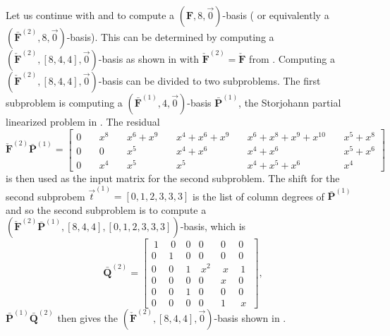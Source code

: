 \begin{exmp}
\label{exm:subproblems} Let us continue with 
and  to compute a $\left(\mathbf{F},8,\vec{0}\right)$-basis
( or equivalently a $(\bar{\mathbf{F}}^{\left(2\right)},8,\vec{0})$-basis).
This can be determined by computing a $(\check{\mathbf{F}}^{\left(2\right)},[8,4,4],\vec{0})$-basis
as shown in  with $\check{\mathbf{F}}^{\left(2\right)}=\check{\mathbf{F}}$
from . Computing a $(\check{\mathbf{F}}^{\left(2\right)},[8,4,4],\vec{0})$-basis
can be divided to two subproblems. The first subproblem is computing
a $(\bar{\mathbf{F}}^{\left(1\right)},4,\vec{0})$-basis $\bar{\mathbf{P}}^{\left(1\right)}$,
the Storjohann partial linearized problem in .
The residual \[
\check{\mathbf{F}}^{(2)}\bar{\mathbf{P}}^{(1)}=\left[{\begin{array}{rcccccccccc}
0 & \  & x^{8} & \  & x^{6}+x^{9} & \  & x^{4}+x^{6}+x^{9} & \  & x^{6}+x^{8}+x^{9}+x^{10} & \  & x^{5}+x^{8}\\
0 &  & 0 &  & x^{5} &  & x^{4}+x^{6} &  & x^{4}+x^{6} &  & x^{5}+x^{6}\\
0 &  & x^{4} &  & x^{5} &  & x^{5} &  & x^{4}+x^{5}+x^{6} &  & x^{4}\end{array}}\right]\]
 is then used as the input matrix for the second subproblem. The shift
for the second subprobem $\vec{t}^{(1)}=[0,1,2,3,3,3]$ is the list
of column degrees of $\bar{\mathbf{P}}^{(1)}$ and so the second subproblem
is to compute a $(\check{\mathbf{F}}^{(2)}\bar{\mathbf{P}}^{(1)},\left[8,4,4\right],[0,1,2,3,3,3])$-basis,
which is \begin{equation}
\bar{\mathbf{Q}}^{(2)}=\left[{\begin{array}{cccccc}
~1~ & ~0~ & 0 & 0 & 0 & 0\\
0 & 1 & 0 & 0 & 0 & 0\\
0 & 0 & 1 & ~x^{2}~ & ~x~ & ~1~\\
0 & 0 & 0 & 0 & x & 0\\
0 & 0 & 1 & 0 & 0 & 0\\
0 & 0 & 0 & 0 & 1 & ~x~\end{array}}\right],\label{eq:Qbar2}\end{equation}
 $\bar{\mathbf{P}}^{(1)}\bar{\mathbf{Q}}^{(2)}$ then gives the $(\check{\mathbf{F}}^{\left(2\right)},[8,4,4],\vec{0})$-basis
shown in . 
\end{exmp}
